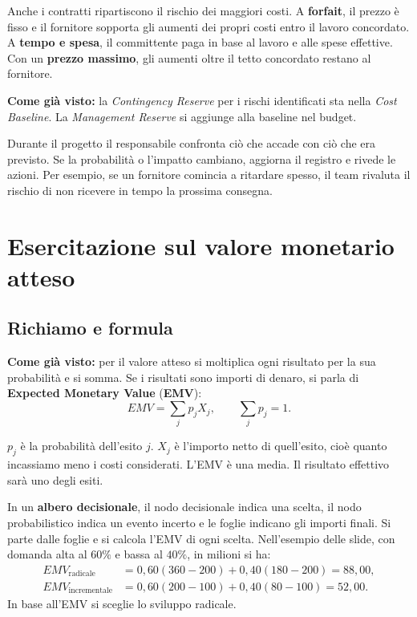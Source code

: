 \noindent Anche i contratti ripartiscono il rischio dei maggiori costi.
A \textbf{forfait}, il prezzo è fisso e il fornitore sopporta gli
aumenti dei propri costi entro il lavoro concordato. A \textbf{tempo
e spesa}, il committente paga in base al lavoro e alle spese effettive.
Con un \textbf{prezzo massimo}, gli aumenti oltre il tetto concordato
restano al fornitore.

\noindent \textbf{Come già visto:} la \emph{Contingency Reserve}
per i rischi identificati sta nella \emph{Cost Baseline}.
La \emph{Management Reserve} si aggiunge alla baseline nel budget.

\noindent Durante il progetto il responsabile confronta ciò che
accade con ciò che era previsto. Se la probabilità o l'impatto
cambiano, aggiorna il registro e rivede le azioni. Per esempio,
se un fornitore comincia a ritardare spesso, il team rivaluta
il rischio di non ricevere in tempo la prossima consegna.

\section{Esercitazione sul valore monetario atteso}

\subsection*{Richiamo e formula}

\noindent \textbf{Come già visto:} per il valore atteso si moltiplica
ogni risultato per la sua probabilità e si somma. Se i risultati
sono importi di denaro, si parla di \textbf{Expected Monetary Value}
(\textbf{EMV}):
\[
    EMV = \sum_j p_j X_j,
    \qquad
    \sum_j p_j = 1.
\]

\noindent $p_j$ è la probabilità dell'esito $j$. $X_j$ è l'importo
netto di quell'esito, cioè quanto incassiamo meno i costi considerati.
L'EMV è una media. Il risultato effettivo sarà uno degli esiti.

\noindent In un \textbf{albero decisionale}, il nodo decisionale
indica una scelta, il nodo probabilistico indica un evento incerto
e le foglie indicano gli importi finali. Si parte dalle foglie e
si calcola l'EMV di ogni scelta. Nell'esempio delle slide, con
domanda alta al $60\%$ e bassa al $40\%$, in milioni si ha:
\begin{align*}
    EMV_{\text{radicale}}
        &= 0{,}60(360-200) + 0{,}40(180-200) = 88{,}00, \\
    EMV_{\text{incrementale}}
        &= 0{,}60(200-100) + 0{,}40(80-100) = 52{,}00.
\end{align*}
\noindent In base all'EMV si sceglie lo sviluppo radicale.

